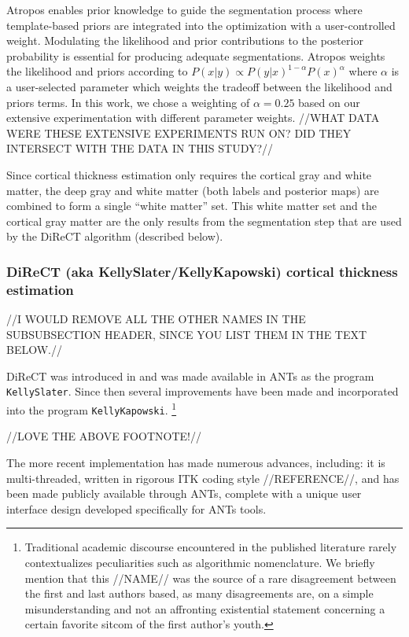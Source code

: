 Atropos enables prior knowledge to guide the
segmentation process where template-based priors are integrated into the optimization
with a user-controlled weight.  Modulating the likelihood and prior contributions
to the posterior probability is essential for producing adequate segmentations.
Atropos weights the likelihood and priors according to
$P(x|y) \propto P(y|x)^{1-\alpha}P(x)^{\alpha}$
where $\alpha$ is a user-selected parameter which weights the tradeoff between the likelihood and priors terms.
In this work, we chose a weighting of $\alpha = 0.25$ 
based on our extensive experimentation with different parameter weights.
//WHAT DATA WERE THESE EXTENSIVE EXPERIMENTS RUN ON? DID THEY INTERSECT WITH THE DATA IN THIS STUDY?//

Since cortical thickness estimation only requires the cortical gray
and white matter, the deep gray and white matter
(both labels and posterior maps) are combined to form a single
``white matter'' set.  This white matter set and the cortical
gray matter are the only results from the segmentation
step that are used by the DiReCT algorithm (described below).


\subsubsection{DiReCT (aka KellySlater/KellyKapowski) cortical thickness estimation}

//I WOULD REMOVE ALL THE OTHER NAMES IN THE SUBSUBSECTION HEADER, SINCE YOU LIST THEM IN THE TEXT BELOW.//

DiReCT was introduced 
in \cite{das2009} and was made available in ANTs as the program \verb#KellySlater#.
Since then several improvements have been made and incorporated into the program
\verb#KellyKapowski#.%
\footnote{
Traditional academic discourse encountered in the published literature
rarely contextualizes peculiarities such as algorithmic nomenclature.
We briefly mention that
this //NAME// was the source of a rare disagreement between the first and last authors
based, as many disagreements are, on a simple misunderstanding and not an
affronting existential statement concerning a certain favorite sitcom
of the first author's youth. 
}

//LOVE THE ABOVE FOOTNOTE!//

The more recent implementation has made numerous advances, including:
it is multi-threaded, written in rigorous ITK coding style //REFERENCE//, and
has been made publicly available through ANTs, complete with a unique user
interface design developed specifically for ANTs tools.

